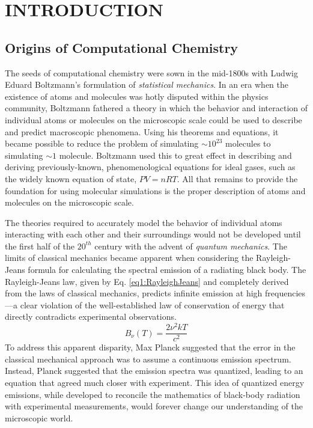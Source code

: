 \chapter{INTRODUCTION}

\section{Origins of Computational Chemistry}
The seeds of computational chemistry were sown in the mid-1800s with Ludwig
Eduard Boltzmann's formulation of \textit{statistical mechanics}. In an era when
the existence of atoms and molecules was hotly disputed within the physics
community, Boltzmann fathered a theory in which the behavior and interaction of
individual atoms or molecules on the microscopic scale could be used to
describe and predict macroscopic phenomena. Using his theorems and equations,
it became possible to reduce the problem of simulating $\sim 10^{23}$ molecules
to simulating $\sim 1$ molecule. Boltzmann used this to great effect in
describing and deriving previously-known, phenomenological equations for ideal
gases, such as the widely known equation of state, $P V = n R T$. All that
remains to provide the foundation for using molecular simulations is the proper
description of atoms and molecules on the microscopic scale.

The theories required to accurately model the behavior of individual atoms
interacting with each other and their surroundings would not be developed until
the first half of the $20^{th}$ century with the advent of \textit{quantum
mechanics}. The limits of classical mechanics became apparent when considering
the Rayleigh-Jeans formula for calculating the spectral emission of a radiating
black body. The Rayleigh-Jeans law, given by Eq. \ref{eq1:RayleighJeans} and
completely derived from the laws of classical mechanics, predicts infinite
emission at high frequencies---a clear violation of the well-established law of
conservation of energy that directly contradicts experimental observations.
\begin{equation}
   B_{\nu} (T)  = \frac{2 \nu^2 k T} {c^2}
   \label{eq1:RayleighJeans}
\end{equation}
To address this apparent disparity, Max Planck suggested that the error in the
classical mechanical approach was to assume a continuous emission spectrum.
Instead, Planck suggested that the emission spectra was quantized, leading to an
equation that agreed much closer with experiment. This idea of quantized energy
emissions, while developed to reconcile the mathematics of black-body radiation
with experimental measurements, would forever change our understanding of the
microscopic world.

